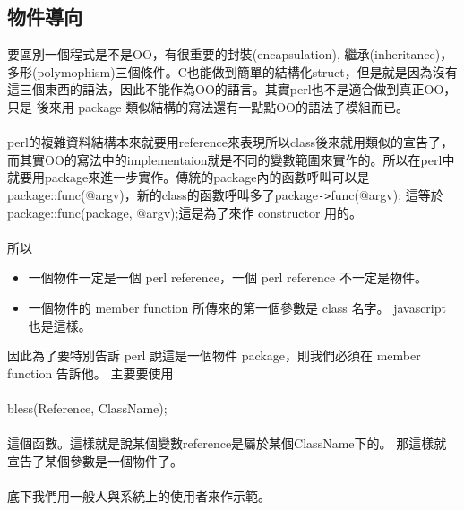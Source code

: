     \subsection{物件導向}
    要區別一個程式是不是OO，有很重要的封裝(encapsulation), 繼承(inheritance)，
    多形(polymophism)三個條件。C也能做到簡單的結構化struct，但是就是因為沒有
    這三個東西的語法，因此不能作為OO的語言。其實perl也不是適合做到真正OO，只是
    後來用 package 類似結構的寫法還有一點點OO的語法子模組而已。\\\\
    perl的複雜資料結構本來就要用reference來表現所以class後來就用類似的宣告了，
    而其實OO的寫法中的implementaion就是不同的變數範圍來實作的。所以在perl中
    就要用package來進一步實作。傳統的package內的函數呼叫可以是
    package::func(@argv)，新的class的函數呼叫多了package\verb=->=func(@argv);
    這等於 package::func(package, @argv);這是為了來作 constructor 用的。
    \\\\
    所以
    \begin{itemize}
    \item 一個物件一定是一個 perl reference，一個 perl reference 不一定是物件。
    \item 一個物件的 member function 所傳來的第一個參數是 class 名字。
      javascript 也是這樣。
    \end{itemize}
    因此為了要特別告訴 perl 說這是一個物件 package，則我們必須在 member function
    告訴他。
    主要要使用
    \\\\
    bless(Reference, ClassName);
    \\\\
    這個函數。這樣就是說某個變數reference是屬於某個ClassName下的。
    那這樣就宣告了某個參數是一個物件了。
    \\\\
    底下我們用一般人與系統上的使用者來作示範。
